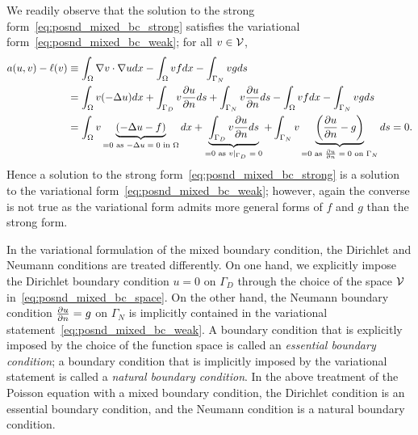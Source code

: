 We readily observe that the solution to the strong form~\eqref{eq:posnd_mixed_bc_strong} satisfies the variational form~\eqref{eq:posnd_mixed_bc_weak};  for all $v \in \mathcal{V}$,
\begin{align*}
  a(u,v) - \ell(v)
  &\equiv \int_\Omega \nabla v \cdot \nabla u dx - \int_\Omega vf dx - \int_{\Gamma_N} vg ds
  \\
  &= \int_\Omega v (-\Delta u) dx + \int_{\Gamma_D} v \frac{\partial u}{\partial n} ds + \int_{\Gamma_N} v \frac{\partial u}{\partial n} ds  - \int_\Omega vf dx - \int_{\Gamma_N} vg ds
  \\
  &= \int_\Omega v \underbrace{ (-\Delta u - f) }_{= 0 \text{ as $-\Delta u=  0$ in $\Omega$}} dx
  + \underbrace{ \int_{\Gamma_D} v \frac{\partial u}{\partial n} ds }_{= 0 \text{ as $v|_{\Gamma_D} = 0$}}
  + \int_{\Gamma_N} v \underbrace{ \left( \frac{\partial u}{\partial n} - g \right) }_{= 0 \text{ as $\frac{\partial u}{\partial n} = 0$ on $\Gamma_N$}}ds = 0.
\end{align*}
Hence a solution to the strong form~\eqref{eq:posnd_mixed_bc_strong} is a solution to the variational form~\eqref{eq:posnd_mixed_bc_weak}; however, again the converse is not true as the variational form admits more general forms of $f$ and $g$ than the strong form.

In the variational formulation of the mixed boundary condition, the Dirichlet and Neumann conditions are treated differently.  On one hand, we explicitly impose the Dirichlet boundary condition $u = 0$ on $\Gamma_D$ through the choice of the space $\mathcal{V}$ in~\eqref{eq:posnd_mixed_bc_space}. On the other hand, the Neumann boundary condition $\frac{\partial u}{\partial n} = g$ on $\Gamma_N$ is implicitly contained in the variational statement~\eqref{eq:posnd_mixed_bc_weak}.  A boundary condition that is explicitly imposed by the choice of the function space is called an \emph{essential boundary condition}; a boundary condition that is implicitly imposed by the variational statement is called a \emph{natural boundary condition}.  In the above treatment of the Poisson equation with a mixed boundary condition, the Dirichlet condition is an essential boundary condition, and the Neumann condition is a natural boundary condition.




